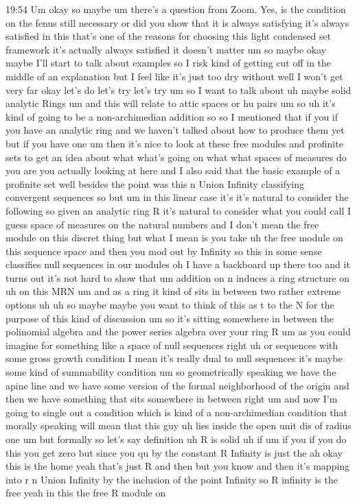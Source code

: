 \begin{unfinished}{19:54}
Um okay so maybe um there's a question from Zoom. Yes, is the condition on the fenus still necessary or did you show that it is always satisfying it's always satisfied in this that's one of the reasons for choosing this light condensed set framework it's actually always satisfied it doesn't matter um so maybe okay maybe I'll start to talk about examples so I risk kind of getting cut off in the middle of an explanation but I feel like it's just too dry without well I won't get very far okay let's do let's try let's try um so I want to talk about uh maybe solid analytic Rings um and this will relate to attic spaces or hu pairs um so uh it's kind of going to be a non-archimedian addition so so I mentioned that if you if you have an analytic ring and we haven't talked about how to produce them yet but if you have one um then it's nice to look at these free modules and profinite sets to get an idea about what what's going on what what spaces of measures do you are you actually looking at here and I also said that the basic example of a profinite set well besides the point was this n Union Infinity classifying convergent sequences so but um in this linear case it's it's natural to consider the following so given an analytic ring R it's natural to consider what you could call I guess space of measures on the natural numbers and I don't mean the free module on this discret thing but what I mean is you take uh the free module on this sequence space and then you mod out by Infinity so this in some sense classifies null sequences in our modules oh I have a backboard up there too and it turns out it's not hard to show that um addition on n induces a ring structure on uh on this MRN um and as a ring it kind of sits in between two rather extreme options uh uh so maybe maybe you want to think of this as t to the N for the purpose of this kind of discussion um so it's sitting somewhere in between the polinomial algebra and the power series algebra over your ring R um as you could imagine for something like a space of null sequences right uh or sequences with some gross growth condition I mean it's really dual to null sequences it's maybe some kind of summability condition um so geometrically speaking we have the apine line and we have some version of the formal neighborhood of the origin and then we have something that sits somewhere in between right um and now I'm going to single out a condition which is kind of a non-archimedian condition that morally speaking will mean that this guy uh lies inside the open unit dis of radius one um but formally so let's say definition uh R is solid uh if um if you if you do this you get zero but since you qu by the constant R Infinity is just the ah okay this is the home yeah that's just R and then but you know and then it's mapping into r n Union Infinity by the inclusion of the point Infinity so R infinity is the free yeah in this the free R module on


\end{unfinished}
